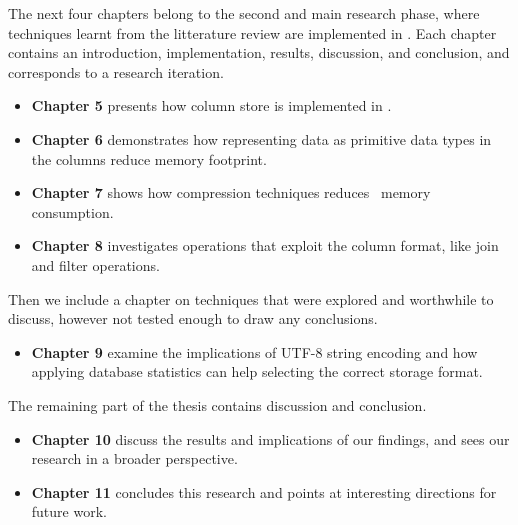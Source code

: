 The next four chapters belong to the second and main research phase, where techniques learnt from the litterature review are implemented in \gap. Each chapter contains an introduction, implementation, results, discussion, and conclusion, and corresponds to a research iteration. 
\begin{itemize}
    \item \textbf{Chapter 5} presents how column store is implemented in \gap.
    \item \textbf{Chapter 6} demonstrates how representing data as primitive data types in the columns reduce memory footprint.
    \item \textbf{Chapter 7} shows how compression techniques reduces \gap~memory consumption.
    \item \textbf{Chapter 8} investigates operations that exploit the column format, like join and filter operations.
\end{itemize}


Then we include a chapter on techniques that were explored and worthwhile to discuss, however not tested enough to draw any conclusions.

\begin{itemize}
    \item \textbf{Chapter 9} examine the implications of UTF-8 string encoding and how applying database statistics can help selecting the correct storage format.
\end{itemize}

The remaining part of the thesis contains discussion and conclusion.
\begin{itemize}
  \item \textbf{Chapter 10} discuss the results and implications of our findings, and sees our research in a broader perspective. 
  \item \textbf{Chapter 11} concludes this research and points at interesting directions for future work.
\end{itemize}



